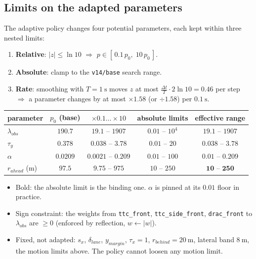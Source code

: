 \documentclass[11pt,a4paper]{article}
\begin{document}
\subsection{Limits on the adapted parameters}\label{sec:constraints-adaptive}
The adaptive policy changes four potential parameters, each kept within three nested limits:
\begin{enumerate}
  \item \textbf{Relative}: $|z| \le \ln 10$ $\Rightarrow$ $p \in [\,0.1\,p_0,\; 10\,p_0\,]$.
  \item \textbf{Absolute}: clamp to the \texttt{v14/base} search range.
  \item \textbf{Rate}: smoothing with $T = 1~\mathrm{s}$ moves $z$ at most
        $\tfrac{\Delta t}{T} \cdot 2\ln 10 = 0.46$ per step $\Rightarrow$ a parameter changes by at most
        $\times 1.58$ (or $\div 1.58$) per $0.1~\mathrm{s}$.
\end{enumerate}
\begin{center}
\small
\begin{tabular}{lcccc}
  \toprule
  parameter & $p_0$ (base) & $\times 0.1 \dots \times 10$ & absolute limits & effective range \\
  \midrule
  $\lambda_{obs}$              & $190.7$  & $19.1$ -- $1907$    & $0.01$ -- $10^4$ & $19.1$ -- $1907$ \\
  $\tau_y$                     & $0.378$  & $0.038$ -- $3.78$   & $0.01$ -- $20$   & $0.038$ -- $3.78$ \\
  $\alpha$                     & $0.0209$ & $0.0021$ -- $0.209$ & $0.01$ -- $100$  & $\mathbf{0.01}$ -- $0.209$ \\
  $r_{ahead}$ (m)              & $97.5$   & $9.75$ -- $975$     & $10$ -- $250$    & $\mathbf{10}$ -- $\mathbf{250}$ \\
  \bottomrule
\end{tabular}
\end{center}
\begin{itemize}
  \item Bold: the absolute limit is the binding one. $\alpha$ is pinned at its $0.01$ floor in practice.
  \item Sign constraint: the weights from \texttt{ttc\_front}, \texttt{ttc\_side\_front}, \texttt{drac\_front}
        to $\lambda_{obs}$ are $\ge 0$ (enforced by reflection, $w \leftarrow |w|$).
  \item Fixed, not adapted: $s_x$, $\delta_{lane}$, $y_{margin}$, $\tau_x = 1$, $r_{behind} = 20~\mathrm{m}$,
        lateral band $8~\mathrm{m}$, the motion limits above. The policy cannot loosen any motion limit.
\end{itemize}
\end{document}
